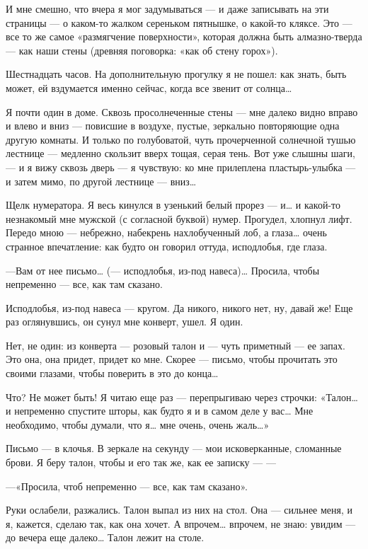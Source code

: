 \documentclass[11pt,openany]{book}
\begin{document}
И мне смешно, что вчера я мог задумываться --- и даже записывать на эти страницы --- о каком-то жалком сереньком пятнышке, о какой-то кляксе. Это --- все то же самое «размягчение поверхности», которая должна быть алмазно-тверда --- как наши стены (древняя поговорка: «как об стену горох»).

Шестнадцать часов. На дополнительную прогулку я не пошел: как знать, быть может, ей вздумается именно сейчас, когда все звенит от солнца\ldots{}

Я почти один в доме. Сквозь просолнеченные стены --- мне далеко видно вправо и влево и вниз --- повисшие в воздухе, пустые, зеркально повторяющие одна другую комнаты. И только по голубоватой, чуть прочерченной солнечной тушью лестнице --- медленно скользит вверх тощая, серая тень. Вот уже слышны шаги, --- и я вижу сквозь дверь --- я чувствую: ко мне прилеплена пластырь-улыбка --- и затем мимо, по другой лестнице --- вниз\ldots{}

Щелк нумератора. Я весь кинулся в узенький белый прорез --- и\ldots{} и какой-то незнакомый мне мужской (с согласной буквой) нумер. Прогудел, хлопнул лифт. Передо мною --- небрежно, набекрень нахлобученный лоб, а глаза\ldots{} очень странное впечатление: как будто он говорил оттуда, исподлобья, где глаза.

---Вам от нее письмо\ldots{} (--- исподлобья, из-под навеса)\ldots{} Просила, чтобы непременно --- все, как там сказано.

Исподлобья, из-под навеса --- кругом. Да никого, никого нет, ну, давай же! Еще раз оглянувшись, он сунул мне конверт, ушел. Я один.

Нет, не один: из конверта --- розовый талон и --- чуть приметный --- ее запах. Это она, она придет, придет ко мне. Скорее --- письмо, чтобы прочитать это своими глазами, чтобы поверить в это до конца\ldots{}

Что? Не может быть! Я читаю еще раз --- перепрыгиваю через строчки: «Талон\ldots{} и непременно спустите шторы, как будто я и в самом деле у вас\ldots{} Мне необходимо, чтобы думали, что я\ldots{} мне очень, очень жаль\ldots{}»

Письмо --- в клочья. В зеркале на секунду --- мои исковерканные, сломанные брови. Я беру талон, чтобы и его так же, как ее записку --- ---

---«Просила, чтоб непременно --- все, как там сказано».

Руки ослабели, разжались. Талон выпал из них на стол. Она --- сильнее меня, и я, кажется, сделаю так, как она хочет. А впрочем\ldots{} впрочем, не знаю: увидим --- до вечера еще далеко\ldots{} Талон лежит на столе.
\end{document}
